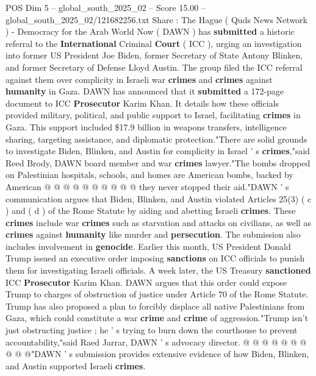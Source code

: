 \begin{textsample}{POS Dim 5 – global\_south\_2025\_02 – Score 15.00 – global\_south\_2025\_02/121682256.txt}  \label{ex:f5_pos_218}
Share : The Hague ( Quds News Network ) - Democracy for the Arab World Now ( DAWN ) has \textbf{submitted} a historic referral to the \textbf{International} Criminal \textbf{Court} ( ICC ), urging an investigation into former US President Joe Biden, former Secretary of State Antony Blinken, and former Secretary of Defense Lloyd Austin.
The group filed the ICC referral against them over complicity in Israeli war \textbf{crimes} and \textbf{crimes} against \textbf{humanity} in Gaza.
DAWN has announced that it \textbf{submitted} a 172-page document to ICC \textbf{Prosecutor} Karim Khan.
It details how these officials provided military, political, and public support to Israel, facilitating \textbf{crimes} in Gaza.
This support included \$17.9 billion in weapons transfers, intelligence sharing, targeting assistance, and diplomatic protection."There are solid grounds to investigate Biden, Blinken, and Austin for complicity in Israel ' s \textbf{crimes},"said Reed Brody, DAWN board member and war \textbf{crimes} lawyer."The bombs dropped on Palestinian hospitals, schools, and homes are American bombs, backed by American @ @ @ @ @ @ @ @ @ @ they never stopped their aid."DAWN ' s communication argues that Biden, Blinken, and Austin violated Articles 25(3) ( c ) and ( d ) of the Rome Statute by aiding and abetting Israeli \textbf{crimes}.
These \textbf{crimes} include war \textbf{crimes} such as starvation and attacks on civilians, as well as \textbf{crimes} against \textbf{humanity} like murder and \textbf{persecution}.
The submission also includes involvement in \textbf{genocide}.
Earlier this month, US President Donald Trump issued an executive order imposing \textbf{sanctions} on ICC officials to punish them for investigating Israeli officials.
A week later, the US Treasury \textbf{sanctioned} ICC \textbf{Prosecutor} Karim Khan.
DAWN argues that this order could expose Trump to charges of obstruction of justice under Article 70 of the Rome Statute.
Trump has also proposed a plan to forcibly displace all native Palestinians from Gaza, which could constitute a war \textbf{crime} and \textbf{crime} of aggression."Trump isn't just obstructing justice ; he ' s trying to burn down the courthouse to prevent accountability,"said Raed Jarrar, DAWN ' s advocacy director. @ @ @ @ @ @ @ @ @ @"DAWN ' s submission provides extensive evidence of how Biden, Blinken, and Austin supported Israeli \textbf{crimes}.

\end{textsample}
